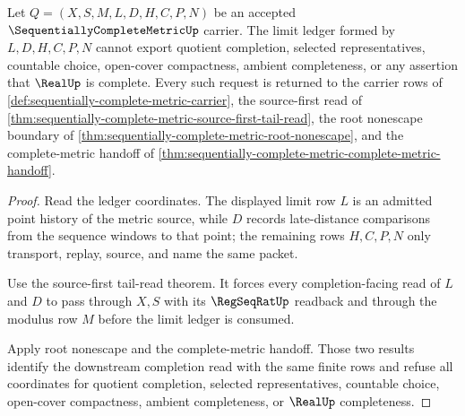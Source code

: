 \begin{theorem}
\label{thm:sequentially-complete-metric-limit-ledger-nonescape}
Let $Q=(X,S,M,L,D,H,C,P,N)$ be an accepted $\SequentiallyCompleteMetricUp$ carrier. The limit ledger formed by $L,D,H,C,P,N$ cannot export quotient completion, selected representatives, countable choice, open-cover compactness, ambient completeness, or any assertion that $\RealUp$ is complete. Every such request is returned to the carrier rows of \autoref{def:sequentially-complete-metric-carrier}, the source-first read of \autoref{thm:sequentially-complete-metric-source-first-tail-read}, the root nonescape boundary of \autoref{thm:sequentially-complete-metric-root-nonescape}, and the complete-metric handoff of \autoref{thm:sequentially-complete-metric-complete-metric-handoff}.
\end{theorem}
\begin{proof}
Read the ledger coordinates. The displayed limit row $L$ is an admitted point history of the metric source, while $D$ records late-distance comparisons from the sequence windows to that point; the remaining rows $H,C,P,N$ only transport, replay, source, and name the same packet.

Use the source-first tail-read theorem. It forces every completion-facing read of $L$ and $D$ to pass through $X,S$ with its $\RegSeqRatUp$ readback and through the modulus row $M$ before the limit ledger is consumed.

Apply root nonescape and the complete-metric handoff. Those two results identify the downstream completion read with the same finite rows and refuse all coordinates for quotient completion, selected representatives, countable choice, open-cover compactness, ambient completeness, or $\RealUp$ completeness.
\end{proof}

